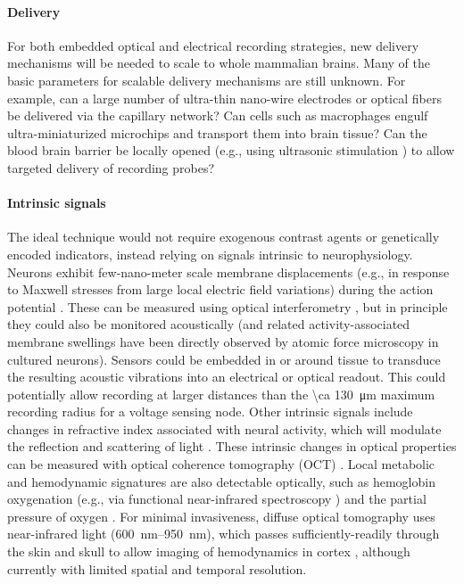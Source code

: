 \paragraph{Delivery} For both embedded optical and electrical recording strategies, new delivery mechanisms will be needed to scale to whole mammalian brains. Many of the basic parameters for scalable delivery mechanisms are still unknown. For example, can a large number of ultra-thin nano-wire electrodes or optical fibers be delivered via the capillary network? Can cells such as macrophages engulf ultra-miniaturized microchips and transport them into brain tissue? Can the blood brain barrier be locally opened (e.g., using ultrasonic stimulation \cite{hynynen2005local}) to allow targeted delivery of recording probes?

\paragraph{Intrinsic signals} The ideal technique would not require exogenous contrast agents or genetically encoded indicators, instead relying on signals intrinsic to neurophysiology. Neurons exhibit few-nano-meter scale \cite{iwasa1980swelling} membrane displacements (e.g., in response to Maxwell stresses from large local electric field variations) during the action potential \cite{oh2012label}. These can be measured using optical interferometry \cite{fang2004noncontact}, but in principle they could also be monitored acoustically (and related activity-associated membrane swellings have been directly observed by atomic force microscopy \cite{kim2007mechanical} in cultured neurons). Sensors could be embedded in or around tissue to transduce the resulting acoustic vibrations into an electrical or optical readout. This could potentially allow recording at larger distances than the \SI{\ca 130}{\micro\meter} maximum recording radius for a voltage sensing node. Other intrinsic signals include changes in refractive index associated with neural activity, which will modulate the reflection and scattering of light \cite{stepnoski1991noninvasive}. These intrinsic changes in optical properties can be measured with optical coherence tomography (OCT) \cite{lazebnik2003functional}. Local metabolic and hemodynamic signatures are also detectable optically, such as hemoglobin oxygenation (e.g., via functional near-infrared spectroscopy \cite{hoshi2003functional}) and the partial pressure of oxygen \cite{parpaleix2013imaging, lecoq2011simultaneous}. For minimal invasiveness, diffuse optical tomography uses near-infrared light (\SIrange{600}{950}{\nano\meter}), which passes sufficiently-readily through the skin and skull to allow imaging of hemodynamics in cortex \cite{hillman2007optical, joseph2006diffuse, huppert200914}, although currently with limited spatial and temporal resolution.


